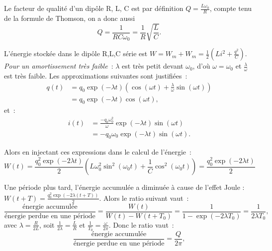     Le facteur de qualité d'un dipôle R, L, C est par définition \(Q = \frac{L\omega_0}{R}\), compte tenu de la formule de Thomson, on a donc aussi
    \begin{equation}
      Q = \frac{1}{RC \omega_0} = \frac{1}{R}\sqrt{\frac{L}{C}}.
    \end{equation}

    L'énergie stockée dans le dipôle R,L,C série est \(W = W_m + W_m = \frac{1}{2}\left(Li^2 + \frac{q^2}{C}\right)\). \emph{Pour un amortissement très faible}~: \(\lambda\) est très petit devant \(\omega_0\), d'où \(\omega = \omega_0\) et \(\frac{\lambda}{\omega}\) est très faible. Les approximations suivantes sont justifiées~:
    \begin{align}
      q(t) &= q_0 \exp(-\lambda t)\left(\cos(\omega t) + \frac{\lambda}{\omega} \sin(\omega t)\right) \\
           &= q_0 \exp(-\lambda t) \cos(\omega t),
    \end{align}
    et~:
    \begin{align}
      i(t) &= \frac{-q_0\omega_0^2}{\omega}\exp(-\lambda t) \sin(\omega t) \\
             &=-q_0 \omega_0 \exp(-\lambda t) \sin(\omega t).
    \end{align}

    Alors en injectant ces expressions dans le calcul de l'énergie~:
    \begin{equation}
      W(t) = \frac{q_0^2 \exp(-2\lambda t)}{2} \left(L\omega_0^2 \sin^2(\omega_0 t) + \frac{1}{C}\cos^2(\omega_0 t)\right) = \frac{q_0^2 \exp(-2\lambda t)}{2}
    \end{equation}

    Une période plus tard, l'énergie accumulée a diminuée à cause de l'effet Joule : \(W(t+T) = \frac{q_0^2 \exp(-2\lambda (t+T))}{2}\). Alors le ratio suivant vaut~:
    \begin{equation}
      \frac{\text{énergie accumulée}}{\text{énergie perdue en une période}} = \frac{W(t)}{W(t) - W(t+T_0)} = \frac{1}{1 - \exp(-2\lambda T_0)} = \frac{1}{2\lambda T_0},
    \end{equation}
    avec \(\lambda = \frac{R}{2L}\), soit \(\frac{1}{2\lambda}=\frac{L}{R}\) et \(\frac{1}{T_0} = \frac{\omega}{2\pi}\). Donc le ratio vaut~:
    \begin{equation}
      \frac{\text{énergie accumulée}}{\text{énergie perdue en une période}} = \frac{Q}{2\pi},
    \end{equation}
